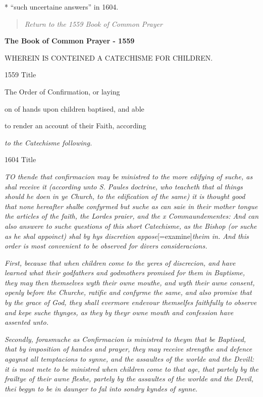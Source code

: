 *
``such uncertaine answers''
in 1604.

\begin{quote}

\emph{Return to the 1559
Book of Common Prayer}

\end{quote}


\textbf{The Book of Common Prayer - 1559}


WHEREIN
IS CONTEINED A CATECHISME FOR CHILDREN.

1559
Title

The Order
of Confirmation, or laying 

on
of hands upon children baptised, and able 

to render
an account of their Faith, according 

\emph{to the Catechisme following.}

1604
Title

\emph{T}\emph{O
thende that confirmacion may be ministred to the more edifying of suche,
as shal receive it (according unto S. Paules doctrine, who teacheth that
al things should he doen in ye Church, to the edification of the same)
it is thought good that none hereafter shalbe confyrmed but suche as can
saie in their mother tongue the articles of the faith, the Lordes praier,
and the x Commaundementes: And can also answere to suche questions of
this short Catechisme, as the Bishop (or suche as he shal appoinct) shal
by hys discretion appose}[=examine]\emph{theim in. And this order is most convenient to be observed for divers
consideracions.}

\emph{First, because that when children come to the yeres of discrecion, and
have learned what their godfathers and godmothers promised for them in
Baptisme, they may then themselves wyth their owne mouthe, and wyth their
awne consent, openly before the Churche, ratifie and confyrme the same,
and also promise that by the grace of God, they shall evermore endevour
themselfes faithfully to observe and kepe suche thynges, as they by theyr
owne mouth and confession have assented unto.}

\emph{Secondly, forasmuche as Confirmacion is ministred to theym that be Baptised,
that by imposition of handes and prayer, they may receive strengthe and
defence agaynst all temptacions to synne, and the assaultes of the worlde
and the Devill: it is most mete to be ministred when children come to
that age, that partely by the frailtye of their awne fleshe, partely by
the assaultes of the worlde and the Devil, thei begyn to be in daunger
to fal into sondry kyndes of synne.}

